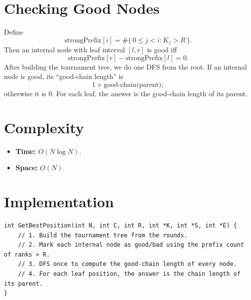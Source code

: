 \documentclass[11pt,a4paper]{article}
\begin{document}
\section{Checking Good Nodes}
Define
\[
\text{strongPrefix}[i] = \#\{\,0 \le j < i : K_j > R\,\}.
\]
Then an internal node with leaf interval $[l,r]$ is good iff
\[
\text{strongPrefix}[r] - \text{strongPrefix}[l] = 0.
\]
After building the tournament tree, we do one DFS from the root.
If an internal node is good, its ``good-chain length'' is
\[
1 + \text{good-chain(parent)};
\]
otherwise it is $0$.
For each leaf, the answer is the good-chain length of its parent.

\section{Complexity}
\begin{itemize}
  \item \textbf{Time:} $O(N \log N)$.
  \item \textbf{Space:} $O(N)$.
\end{itemize}

\section{Implementation}
\begin{lstlisting}
int GetBestPosition(int N, int C, int R, int *K, int *S, int *E) {
    // 1. Build the tournament tree from the rounds.
    // 2. Mark each internal node as good/bad using the prefix count of ranks > R.
    // 3. DFS once to compute the good-chain length of every node.
    // 4. For each leaf position, the answer is the chain length of its parent.
}
\end{lstlisting}
\end{document}
